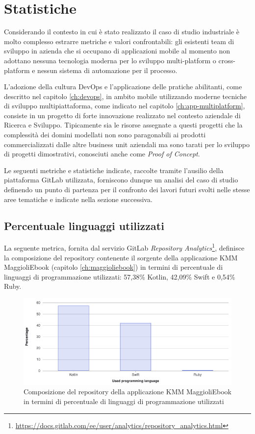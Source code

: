 \section{Statistiche}
Considerando il contesto in cui è stato realizzato il caso di studio industriale è molto complesso estrarre metriche e valori confrontabili: gli esistenti team di sviluppo in azienda che si occupano di applicazioni mobile al momento non adottano nessuna tecnologia moderna per lo sviluppo multi-platform o cross-platform e nessun sistema di automazione per il processo.

L'adozione della cultura DevOps e l'applicazione delle pratiche abilitanti, come descritto nel capitolo \ref{ch:devops}, in ambito mobile utilizzando moderne tecniche di sviluppo multipiattaforma, come indicato nel capitolo \ref{ch:app-multiplatform}, consiste in un progetto di forte innovazione realizzato nel contesto aziendale di Ricerca e Sviluppo. Tipicamente sia le risorse assegnate a questi progetti che la complessità dei domini modellati non sono paragonabili ai prodotti commercializzati dalle altre business unit aziendali ma sono tarati per lo sviluppo di progetti dimostrativi, conosciuti anche come \textit{Proof of Concept}.

Le seguenti metriche e statistiche indicate, raccolte tramite l'ausilio della piattaforma GitLab utilizzata, forniscono dunque un analisi del caso di studio definendo un punto di partenza per il confronto dei lavori futuri svolti nelle stesse aree tematiche e indicate nella sezione successiva.

\subsection*{Percentuale linguaggi utilizzati}
La seguente metrica, fornita dal servizio GitLab \textit{Repository Analytics}\footnote{\href{https://docs.gitlab.com/ee/user/analytics/repository\_analytics.html}{https://docs.gitlab.com/ee/user/analytics/repository\_analytics.html}}, definisce la composizione del repository contenente il sorgente della applicazione KMM MaggioliEbook (capitolo \ref{ch:maggioliebook}) in termini di percentuale di linguaggi di programmazione utilizzati: 57,38\% Kotlin, 42,09\% Swift e 0,54\% Ruby.

\begin{figure}[H]
\centering
    \includegraphics[width=1\textwidth]{img/repo-code-lang-percent.png}
    \caption{Composizione del repository della applicazione KMM MaggioliEbook in termini di percentuale di linguaggi di programmazione utilizzati}
    \label{repo-code-lang-percent}
\end{figure}

